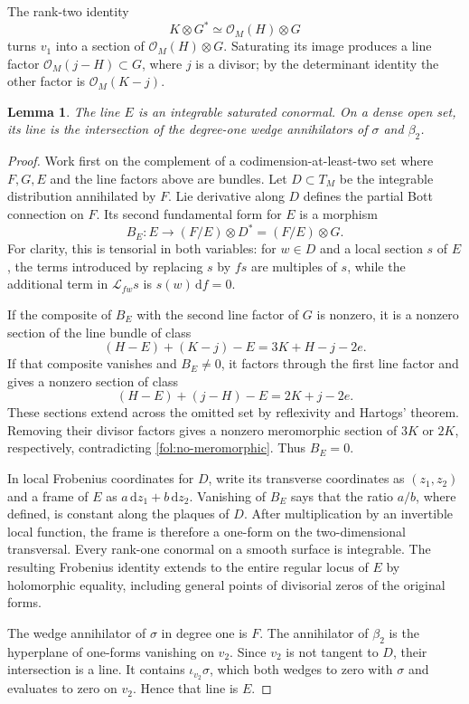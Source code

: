 \documentclass[11pt,letterpaper]{article}
\newcommand{\OO}{\mathcal{O}}
\newcommand{\dd}{\mathrm{d}}
\newtheorem{lemma}[theorem]{Lemma}
\theoremstyle{definition}
\theoremstyle{remark}
\begin{document}
The rank-two identity
\[
 K\otimes G^*\simeq\OO_M(H)\otimes G
\]
turns $v_1$ into a section of $\OO_M(H)\otimes G$.  Saturating its image
produces a line factor $\OO_M(j-H)\subset G$, where $j$ is a divisor;
by the determinant identity the other factor is $\OO_M(K-j)$.

\begin{lemma}\label{fol:Bott-integrability}
The line $E$ is an integrable saturated conormal.  On a dense open set,
its line is the intersection of the degree-one wedge annihilators of
$\sigma$ and $\beta_2$.
\end{lemma}

\begin{proof}
Work first on the complement of a codimension-at-least-two set where
$F,G,E$ and the line factors above are bundles.  Let $D\subset T_M$ be
the integrable distribution annihilated by $F$.  Lie derivative along
$D$ defines the partial Bott connection on $F$.  Its second fundamental
form for $E$ is a morphism
\begin{equation}\label{fol:Bott-tensor}
 B_E\colon E\longrightarrow(F/E)\otimes D^*
                 =(F/E)\otimes G.
\end{equation}
For clarity, this is tensorial in both variables: for $w\in D$ and a
local section $s$ of $E$, the terms introduced by replacing $s$ by $fs$
are multiples of $s$, while the additional term in $\mathcal L_{fw}s$
is $s(w)\,\dd f=0$.

If the composite of $B_E$ with the second line factor of $G$ is nonzero,
it is a nonzero section of the line bundle of class
\[
 (H-E)+(K-j)-E=3K+H-j-2e.
\]
If that composite vanishes and $B_E\ne0$, it factors through the first
line factor and gives a nonzero section of class
\[
 (H-E)+(j-H)-E=2K+j-2e.
\]
These sections extend across the omitted set by reflexivity and Hartogs'
theorem.  Removing their divisor factors gives a nonzero meromorphic
section of $3K$ or $2K$, respectively, contradicting
\eqref{fol:no-meromorphic}.  Thus $B_E=0$.

In local Frobenius coordinates for $D$, write its transverse coordinates
as $(z_1,z_2)$ and a frame of $E$ as $a\,\dd z_1+b\,\dd z_2$.
Vanishing of $B_E$ says that the ratio $a/b$, where defined, is constant
along the plaques of $D$.  After multiplication by an invertible local
function, the frame is therefore a one-form on the two-dimensional
transversal.  Every rank-one conormal on a smooth surface is integrable.
The resulting Frobenius identity extends to the entire regular locus
of $E$ by holomorphic equality, including general points of divisorial
zeros of the original forms.

The wedge annihilator of $\sigma$ in degree one is $F$.  The annihilator
of $\beta_2$ is the hyperplane of one-forms vanishing on $v_2$.  Since
$v_2$ is not tangent to $D$, their intersection is a line.  It contains
$\iota_{v_2}\sigma$, which both wedges to zero with $\sigma$ and
evaluates to zero on $v_2$.  Hence that line is $E$.
\end{proof}
\end{document}
